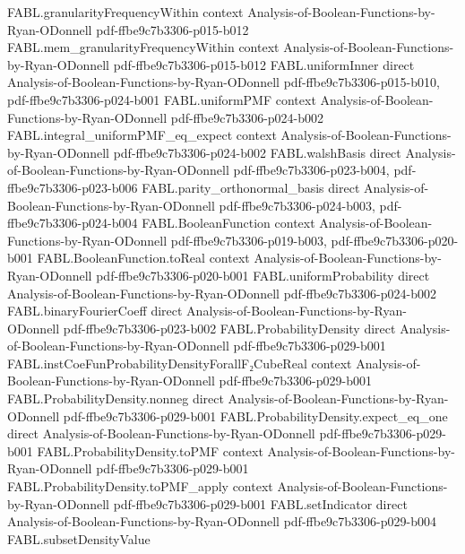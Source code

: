 \begin{theorem}
\proofstep
  {FABL.granularityFrequencyWithin}
  {context}
  {Analysis-of-Boolean-Functions-by-Ryan-ODonnell}
  {pdf-ffbe9c7b3306-p015-b012}
\proofstep
  {FABL.mem_granularityFrequencyWithin}
  {context}
  {Analysis-of-Boolean-Functions-by-Ryan-ODonnell}
  {pdf-ffbe9c7b3306-p015-b012}
\proofstep
  {FABL.uniformInner}
  {direct}
  {Analysis-of-Boolean-Functions-by-Ryan-ODonnell}
  {pdf-ffbe9c7b3306-p015-b010,
    pdf-ffbe9c7b3306-p024-b001}
\proofstep
  {FABL.uniformPMF}
  {context}
  {Analysis-of-Boolean-Functions-by-Ryan-ODonnell}
  {pdf-ffbe9c7b3306-p024-b002}
\proofstep
  {FABL.integral_uniformPMF_eq_expect}
  {context}
  {Analysis-of-Boolean-Functions-by-Ryan-ODonnell}
  {pdf-ffbe9c7b3306-p024-b002}
\proofstep
  {FABL.walshBasis}
  {direct}
  {Analysis-of-Boolean-Functions-by-Ryan-ODonnell}
  {pdf-ffbe9c7b3306-p023-b004,
    pdf-ffbe9c7b3306-p023-b006}
\proofstep
  {FABL.parity_orthonormal_basis}
  {direct}
  {Analysis-of-Boolean-Functions-by-Ryan-ODonnell}
  {pdf-ffbe9c7b3306-p024-b003,
    pdf-ffbe9c7b3306-p024-b004}
\proofstep
  {FABL.BooleanFunction}
  {context}
  {Analysis-of-Boolean-Functions-by-Ryan-ODonnell}
  {pdf-ffbe9c7b3306-p019-b003,
    pdf-ffbe9c7b3306-p020-b001}
\proofstep
  {FABL.BooleanFunction.toReal}
  {context}
  {Analysis-of-Boolean-Functions-by-Ryan-ODonnell}
  {pdf-ffbe9c7b3306-p020-b001}
\proofstep
  {FABL.uniformProbability}
  {direct}
  {Analysis-of-Boolean-Functions-by-Ryan-ODonnell}
  {pdf-ffbe9c7b3306-p024-b002}
\proofstep
  {FABL.binaryFourierCoeff}
  {direct}
  {Analysis-of-Boolean-Functions-by-Ryan-ODonnell}
  {pdf-ffbe9c7b3306-p023-b002}
\proofstep
  {FABL.ProbabilityDensity}
  {direct}
  {Analysis-of-Boolean-Functions-by-Ryan-ODonnell}
  {pdf-ffbe9c7b3306-p029-b001}
\proofstep
  {FABL.instCoeFunProbabilityDensityForallF₂CubeReal}
  {context}
  {Analysis-of-Boolean-Functions-by-Ryan-ODonnell}
  {pdf-ffbe9c7b3306-p029-b001}
\proofstep
  {FABL.ProbabilityDensity.nonneg}
  {direct}
  {Analysis-of-Boolean-Functions-by-Ryan-ODonnell}
  {pdf-ffbe9c7b3306-p029-b001}
\proofstep
  {FABL.ProbabilityDensity.expect_eq_one}
  {direct}
  {Analysis-of-Boolean-Functions-by-Ryan-ODonnell}
  {pdf-ffbe9c7b3306-p029-b001}
\proofstep
  {FABL.ProbabilityDensity.toPMF}
  {context}
  {Analysis-of-Boolean-Functions-by-Ryan-ODonnell}
  {pdf-ffbe9c7b3306-p029-b001}
\proofstep
  {FABL.ProbabilityDensity.toPMF_apply}
  {context}
  {Analysis-of-Boolean-Functions-by-Ryan-ODonnell}
  {pdf-ffbe9c7b3306-p029-b001}
\proofstep
  {FABL.setIndicator}
  {direct}
  {Analysis-of-Boolean-Functions-by-Ryan-ODonnell}
  {pdf-ffbe9c7b3306-p029-b004}
\proofstep
  {FABL.subsetDensityValue}

\end{theorem}
